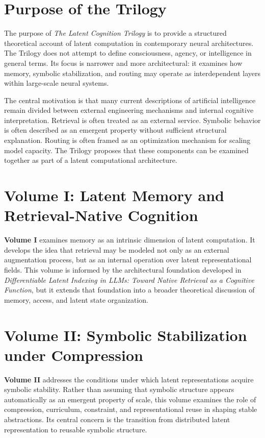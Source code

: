 \section{Purpose of the Trilogy}

The purpose of \textit{The Latent Cognition Trilogy} is to provide a structured theoretical account of latent computation in contemporary neural architectures. The Trilogy does not attempt to define consciousness, agency, or intelligence in general terms. Its focus is narrower and more architectural: it examines how memory, symbolic stabilization, and routing may operate as interdependent layers within large-scale neural systems.

The central motivation is that many current descriptions of artificial intelligence remain divided between external engineering mechanisms and internal cognitive interpretation. Retrieval is often treated as an external service. Symbolic behavior is often described as an emergent property without sufficient structural explanation. Routing is often framed as an optimization mechanism for scaling model capacity. The Trilogy proposes that these components can be examined together as part of a latent computational architecture.

\section{Volume I: Latent Memory and Retrieval-Native Cognition}

\textbf{Volume I} examines memory as an intrinsic dimension of latent computation. It develops the idea that retrieval may be modeled not only as an external augmentation process, but as an internal operation over latent representational fields. This volume is informed by the architectural foundation developed in \textit{Differentiable Latent Indexing in LLMs: Toward Native Retrieval as a Cognitive Function}, but it extends that foundation into a broader theoretical discussion of memory, access, and latent state organization.

\section{Volume II: Symbolic Stabilization under Compression}

\textbf{Volume II} addresses the conditions under which latent representations acquire symbolic stability. Rather than assuming that symbolic structure appears automatically as an emergent property of scale, this volume examines the role of compression, curriculum, constraint, and representational reuse in shaping stable abstractions. Its central concern is the transition from distributed latent representation to reusable symbolic structure.

